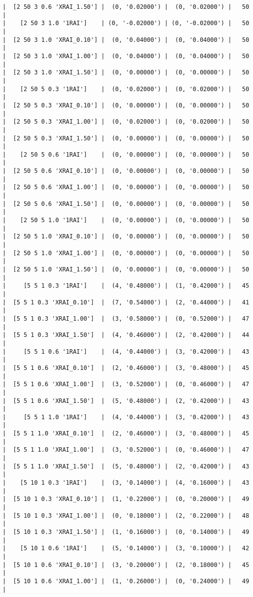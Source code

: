 \documentclass{article}
\begin{document}
\begin{verbatim}
|  [2 50 3 0.6 'XRAI_1.50'] |  (0, '0.02000') |  (0, '0.02000') |   50  |
|    [2 50 3 1.0 '1RAI']    | (0, '-0.02000') | (0, '-0.02000') |   50  |
|  [2 50 3 1.0 'XRAI_0.10'] |  (0, '0.04000') |  (0, '0.04000') |   50  |
|  [2 50 3 1.0 'XRAI_1.00'] |  (0, '0.04000') |  (0, '0.04000') |   50  |
|  [2 50 3 1.0 'XRAI_1.50'] |  (0, '0.00000') |  (0, '0.00000') |   50  |
|    [2 50 5 0.3 '1RAI']    |  (0, '0.02000') |  (0, '0.02000') |   50  |
|  [2 50 5 0.3 'XRAI_0.10'] |  (0, '0.00000') |  (0, '0.00000') |   50  |
|  [2 50 5 0.3 'XRAI_1.00'] |  (0, '0.02000') |  (0, '0.02000') |   50  |
|  [2 50 5 0.3 'XRAI_1.50'] |  (0, '0.00000') |  (0, '0.00000') |   50  |
|    [2 50 5 0.6 '1RAI']    |  (0, '0.00000') |  (0, '0.00000') |   50  |
|  [2 50 5 0.6 'XRAI_0.10'] |  (0, '0.00000') |  (0, '0.00000') |   50  |
|  [2 50 5 0.6 'XRAI_1.00'] |  (0, '0.00000') |  (0, '0.00000') |   50  |
|  [2 50 5 0.6 'XRAI_1.50'] |  (0, '0.00000') |  (0, '0.00000') |   50  |
|    [2 50 5 1.0 '1RAI']    |  (0, '0.00000') |  (0, '0.00000') |   50  |
|  [2 50 5 1.0 'XRAI_0.10'] |  (0, '0.00000') |  (0, '0.00000') |   50  |
|  [2 50 5 1.0 'XRAI_1.00'] |  (0, '0.00000') |  (0, '0.00000') |   50  |
|  [2 50 5 1.0 'XRAI_1.50'] |  (0, '0.00000') |  (0, '0.00000') |   50  |
|     [5 5 1 0.3 '1RAI']    |  (4, '0.48000') |  (1, '0.42000') |   45  |
|  [5 5 1 0.3 'XRAI_0.10']  |  (7, '0.54000') |  (2, '0.44000') |   41  |
|  [5 5 1 0.3 'XRAI_1.00']  |  (3, '0.58000') |  (0, '0.52000') |   47  |
|  [5 5 1 0.3 'XRAI_1.50']  |  (4, '0.46000') |  (2, '0.42000') |   44  |
|     [5 5 1 0.6 '1RAI']    |  (4, '0.44000') |  (3, '0.42000') |   43  |
|  [5 5 1 0.6 'XRAI_0.10']  |  (2, '0.46000') |  (3, '0.48000') |   45  |
|  [5 5 1 0.6 'XRAI_1.00']  |  (3, '0.52000') |  (0, '0.46000') |   47  |
|  [5 5 1 0.6 'XRAI_1.50']  |  (5, '0.48000') |  (2, '0.42000') |   43  |
|     [5 5 1 1.0 '1RAI']    |  (4, '0.44000') |  (3, '0.42000') |   43  |
|  [5 5 1 1.0 'XRAI_0.10']  |  (2, '0.46000') |  (3, '0.48000') |   45  |
|  [5 5 1 1.0 'XRAI_1.00']  |  (3, '0.52000') |  (0, '0.46000') |   47  |
|  [5 5 1 1.0 'XRAI_1.50']  |  (5, '0.48000') |  (2, '0.42000') |   43  |
|    [5 10 1 0.3 '1RAI']    |  (3, '0.14000') |  (4, '0.16000') |   43  |
|  [5 10 1 0.3 'XRAI_0.10'] |  (1, '0.22000') |  (0, '0.20000') |   49  |
|  [5 10 1 0.3 'XRAI_1.00'] |  (0, '0.18000') |  (2, '0.22000') |   48  |
|  [5 10 1 0.3 'XRAI_1.50'] |  (1, '0.16000') |  (0, '0.14000') |   49  |
|    [5 10 1 0.6 '1RAI']    |  (5, '0.14000') |  (3, '0.10000') |   42  |
|  [5 10 1 0.6 'XRAI_0.10'] |  (3, '0.20000') |  (2, '0.18000') |   45  |
|  [5 10 1 0.6 'XRAI_1.00'] |  (1, '0.26000') |  (0, '0.24000') |   49  |

\end{verbatim}
\end{document}
